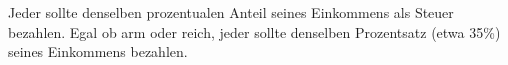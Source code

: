 Jeder sollte denselben prozentualen Anteil seines Einkommens als Steuer bezahlen.
Egal ob arm oder reich, jeder sollte denselben Prozentsatz (etwa 35\%) seines Einkommens bezahlen.